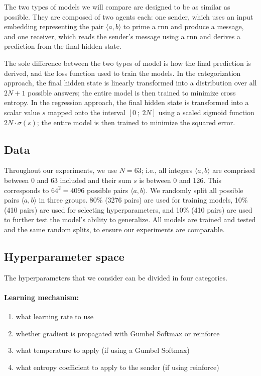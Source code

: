 \documentclass[twocolumn]{article}
\begin{document}
The two types of models we will compare are designed to be as similar as possible. 
They are composed of two agents each: one sender, which uses an input embedding representing the pair $\langle a,b \rangle$ to prime a {\sc rnn} and produce a message, and one receiver, which reads the sender's message using a {\sc rnn} and derives a prediction from the final hidden state.

The sole difference between the two types of model is how the final prediction is derived, and the loss function used to train the models.
In the categorization approach, the final hidden state is linearly transformed into a distribution over all $2N + 1$ possible answers; the entire model is then trained to minimize cross entropy.
In the regression approach, the final hidden state is transformed into a scalar value $s$ mapped onto the interval $\left[0~; ~2N \right]$ using a scaled sigmoid function $2N\cdot\sigma(s)$; the entire model is then trained to minimize the squared error. 

\subsection{Data} \label{sec:experiment:data}

Throughout our experiments, we use $N=63$; i.e., all integers $\langle a,b \rangle$ are comprised between 0 and 63 included and their sum $s$ is between 0 and 126. 
This corresponds to $64^2=4096$ possible pairs $\langle a,b \rangle$.
We randomly split all possible pairs $\langle a,b \rangle$ in three groups. 80\% (3276 pairs) are used for training models, 10\% (410 pairs) are used for selecting hyperparameters, and 10\% (410 pairs) are used to further test the model's ability to generalize.
All models are trained and tested and the same random splits, to ensure our experiments are comparable.

\subsection{Hyperparameter space} \label{sec:experiment:hparams}

The hyperparameters that we consider can be divided in four categories.

\vspace*{-0.5em}
\paragraph{Learning mechanism:} 
\begin{enumerate}[label=(\roman*)]
    \vspace*{-0.5em}
    \itemsep-0.25em 
    \item what learning rate to use
    \item \label{it:hp:mechanism} whether gradient is propagated with Gumbel Softmax or {\sc reinforce}
    \item \label{it:hp:temp} what temperature to apply (if using a Gumbel Softmax)
    \item \label{it:hp:entropy} what entropy coefficient to apply to the sender (if using {\sc reinforce})
\end{enumerate}
\end{document}
